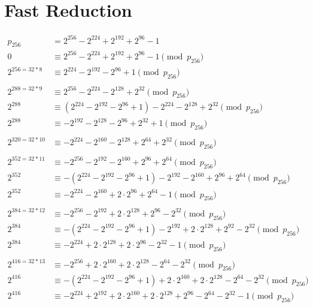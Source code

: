 \newpage
\section{Fast Reduction}

\begin{align*}
p_{256} &= 2^{256} - 2^{224} + 2^{192} + 2^{96} - 1 \\
0 &\equiv 2^{256} - 2^{224} + 2^{192} + 2^{96} - 1 \pmod{p_{256}} \\
2^{256=32*8} &\equiv 2^{224} - 2^{192} - 2^{96} + 1 \pmod{p_{256}} \\
\\
2^{288=32*9} &\equiv 2^{256} - 2^{224} - 2^{128} + 2^{32} \pmod{p_{256}} \\
2^{288} &\equiv (2^{224} - 2^{192} - 2^{96} + 1) - 2^{224} - 2^{128} + 2^{32} \pmod{p_{256}} \\
2^{288} &\equiv - 2^{192} - 2^{128} - 2^{96} + 2^{32} + 1 \pmod{p_{256}} \\
\\
2^{320=32*10} &\equiv - 2^{224} - 2^{160} - 2^{128} + 2^{64} + 2^{32} \pmod{p_{256}} \\
\\
2^{352=32*11} &\equiv - 2^{256} - 2^{192} - 2^{160} + 2^{96} + 2^{64} \pmod{p_{256}} \\
2^{352} &\equiv - (2^{224} - 2^{192} - 2^{96} + 1) - 2^{192} - 2^{160} + 2^{96} + 2^{64} \pmod{p_{256}} \\
2^{352} &\equiv - 2^{224} - 2^{160} + 2\cdot 2^{96} + 2^{64} - 1 \pmod{p_{256}} \\
\\
2^{384=32*12} &\equiv - 2^{256} - 2^{192} + 2\cdot 2^{128} + 2^{96} - 2^{32} \pmod{p_{256}} \\
2^{384} &\equiv - (2^{224} - 2^{192} - 2^{96} + 1) - 2^{192} + 2\cdot 2^{128} + 2^{92} - 2^{32} \pmod{p_{256}} \\
2^{384} &\equiv - 2^{224} + 2\cdot 2^{128} + 2\cdot 2^{96} - 2^{32} - 1 \pmod{p_{256}} \\
\\
2^{416=32*13} &\equiv - 2^{256} + 2\cdot 2^{160} + 2\cdot 2^{128} - 2^{64} - 2^{32} \pmod{p_{256}} \\
2^{416} &\equiv - (2^{224} - 2^{192} - 2^{96} + 1) + 2\cdot 2^{160} + 2\cdot 2^{128} - 2^{64} - 2^{32} \pmod{p_{256}} \\
2^{416} &\equiv - 2^{224} + 2^{192} + 2\cdot 2^{160} + 2\cdot 2^{128} + 2^{96} - 2^{64} - 2^{32} - 1 \pmod{p_{256}} \\
\\

\end{align*}
